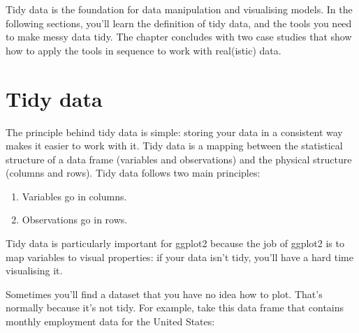 Tidy data is the foundation for data manipulation and visualising
models. In the following sections, you'll learn the definition of tidy
data, and the tools you need to make messy data tidy. The chapter
concludes with two case studies that show how to apply the tools in
sequence to work with real(istic) data.

\hypertarget{sec:tidy-data}{%
\section{Tidy data}\label{sec:tidy-data}}

The principle behind tidy data is simple: storing your data in a
consistent way makes it easier to work with it. Tidy data is a mapping
between the statistical structure of a data frame (variables and
observations) and the physical structure (columns and rows). Tidy data
follows two main principles: 

\begin{enumerate}
\def\labelenumi{\arabic{enumi}.}
\tightlist
\item
  Variables go in columns.
\item
  Observations go in rows.
\end{enumerate}

Tidy data is particularly important for ggplot2 because the job of
ggplot2 is to map variables to visual properties: if your data isn't
tidy, you'll have a hard time visualising it.

Sometimes you'll find a dataset that you have no idea how to plot.
That's normally because it's not tidy. For example, take this data frame
that contains monthly employment data for the United States:

\begin{Shaded}
\begin{Highlighting}[]
\end{Highlighting}
\end{Shaded}


